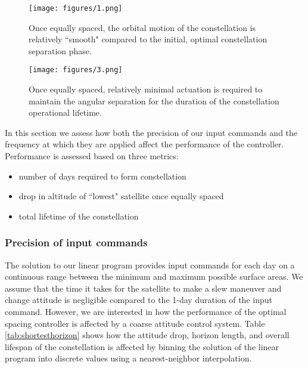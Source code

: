 \documentclass[letterpaper, 10 pt, conference]{ieeeconf}  %
\begin{document}
\begin{figure}[h]
\centering
\texttt{[image: figures/1.png]}
\caption{Once equally spaced, the orbital motion of the constellation is relatively ``smooth" compared to the initial, optimal constellation separation phase.}
\label{fig:stateslifetime}
\end{figure}

\begin{figure}[h]
\centering
\texttt{[image: figures/3.png]}
\caption{Once equally spaced, relatively minimal actuation is required to maintain the angular separation for the duration of the constellation operational lifetime.}
\label{fig:inputslifetime}
\end{figure}

\iffalse

In this section we assess how both the precision of our input commands and the frequency at which they are applied affect the performance of the controller. Performance is assessed based on three metrics:
\begin{itemize}
\item number of days required to form constellation
\item drop in altitude of ``lowest" satellite once equally spaced
\item total lifetime of the constellation  \\
\end{itemize} 

\subsubsection{Precision of input commands}

The solution to our linear program provides input commands for each day on a continuous range between the minimum and maximum possible surface areas. We assume that the time it takes for the satellite to make a slew maneuver and change attitude is negligible compared to the 1-day duration of the input command. However, we are interested in how the performance of the optimal spacing controller is affected by a coarse attitude control system. Table \ref{tab:shortesthorizon} shows how the attitude drop, horizon length, and overall lifespan of the constellation is affected by binning the solution of the linear program into discrete values using a nearest-neighbor interpolation.
\end{document}
